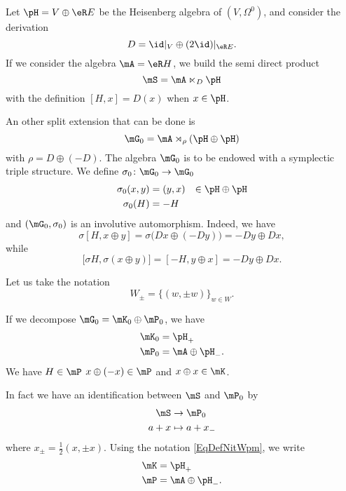 Let $\pH=V\oplus\eR E$  be the Heisenberg algebra of $(V,\Omega^0)$, and consider the derivation
\begin{equation}
	D=\id|_V\oplus(2\id)|_{\eR E}.
\end{equation}
If we consider the algebra $\mA=\eR H$, we build the semi direct product
\begin{equation}
	\mS=\mA\ltimes_D\pH
\end{equation}
with the definition $[H,x]=D(x)$ when $x\in\pH$.

An other split extension that can be done is
\begin{equation}
	\mG_0=\mA\rtimes_{\rho}(\pH\oplus\pH)
\end{equation}
with $\rho=D\oplus(-D)$. The algebra $\mG_0$ is to be endowed with a symplectic triple structure. We define $\sigma_0\colon \mG_0\to \mG_0$
\begin{equation}
	\begin{aligned}[]
		\sigma_0(x,y)&=(y,x)&\in\pH\oplus\pH\\
		\sigma_0(H)&=-H
	\end{aligned}
\end{equation}
and $(\mG_0,\sigma_0)$ is an involutive automorphism. Indeed, we have
\begin{equation}
	\sigma[H,x\oplus y]=\sigma\big( Dx\oplus(-Dy) \big)=-Dy\oplus Dx,
\end{equation}
while
\begin{equation}
	\big[ \sigma H,\sigma(x\oplus y) \big]=[-H,y\oplus x]=-Dy\oplus Dx.
\end{equation}

Let us take the notation
\begin{equation}		\label{EqDefNitWpm}
	W_{\pm}=\{ (w,\pm w) \}_{w\in W}.
\end{equation}

If we decompose $\mG_0=\mK_0\oplus\mP_0$, we have
\begin{equation}
	\begin{aligned}[]
		\mK_0&=\pH_+\\
		\mP_0&=\mA\oplus\pH_-.
	\end{aligned}
\end{equation}
We have $H\in\mP$ $x\oplus(-x)\in\mP$ and $x\oplus x\in\mK$.

In fact we have an identification between $\mS$ and $\mP_0$ by
\begin{equation}
	\begin{aligned}
		\mS&\to \mP_0 \\
		a+x&\mapsto a+x_-
	\end{aligned}
\end{equation}
where $x_{\pm}=\frac{ 1 }{2}(x,\pm x)$. Using the notation \eqref{EqDefNitWpm}, we write
\begin{equation}
	\begin{aligned}[]
		\mK&=\pH_{+}\\
		\mP&=\mA\oplus\pH_{-}.
	\end{aligned}
\end{equation}


